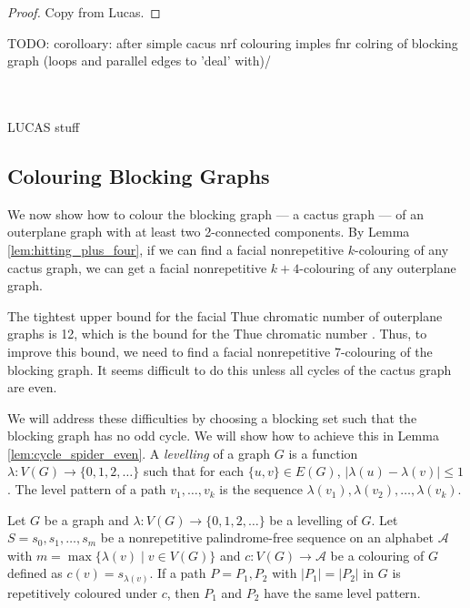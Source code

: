 \documentclass{patmorin}
\begin{document}
\begin{proof}
   Copy from Lucas.
\end{proof}


TODO: corolloary: after simple cacus   nrf colouring imples fnr colring of blocking graph
(loops and parallel edges to 'deal' with)/


~\\~\\
LUCAS stuff


\subsection{Colouring Blocking Graphs}

We now show how to colour the blocking graph --- a cactus graph --- of an outerplane graph with at least two 2-connected components.
By Lemma \ref{lem:hitting_plus_four}, if we can find a facial nonrepetitive $k$-colouring of any cactus graph, we can get a facial nonrepetitive $k+4$-colouring of any outerplane graph. 

The tightest upper bound for the facial Thue chromatic number of outerplane graphs is 12, which is the bound for the Thue chromatic number \cite{barat2007square, kundgen2008nonrepetitive}. Thus, to improve this bound, we need to find a facial nonrepetitive 7-colouring of the blocking graph. It seems difficult to do this unless all cycles of the cactus graph are even. 

We will address these difficulties by choosing a blocking set such that the blocking graph has no odd cycle. We will show how to achieve this in Lemma \ref{lem:cycle_spider_even}. 
A \emph{levelling} of a graph $G$ is a function $\lambda\colon V(G)\to \{0, 1, 2,\dots\}$ such that for each $\{u,v\}\in E(G)$, $|\lambda(u)-\lambda(v)|\leq 1$. The level pattern of a path $v_1,\ldots,v_k$ is the sequence $\lambda(v_1),\lambda(v_2),\ldots,\lambda(v_k)$.

\begin{lem} 
 Let $G$ be a graph and $\lambda\colon V(G)\to \{0, 1, 2,\dots\}$ be a levelling of $G$. Let $S=s_0,s_1,\ldots,s_m$ be a nonrepetitive palindrome-free sequence on an alphabet $\mathcal{A}$ with $m=\max\{\lambda(v) \;|\; v \in V(G)\}$ and $c : V(G) \rightarrow \mathcal{A}$ be a colouring of $G$ defined as $c(v)=s_{\lambda(v)}$. %
 If a path $P=P_1, P_2$ with $|P_1|=|P_2|$ in $G$ is repetitively coloured under $c$, then $P_1$ and $P_2$ have the same level pattern.
\end{lem}
\end{document}
